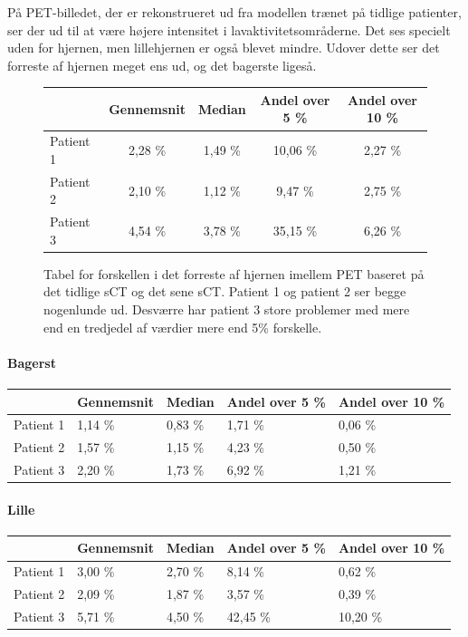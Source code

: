 På PET-billedet, der er rekonstrueret ud fra modellen trænet på tidlige
patienter, ser der ud til at være højere intensitet i
lavaktivitetsområderne. Det ses specielt uden for hjernen, men
lillehjernen er også blevet mindre. Udover dette ser det forreste af
hjernen meget ens ud, og det bagerste ligeså.

\begin{figure}
    \centering
    \begin{tabular}{| l | c | c | c | c |}
        \hline
         & Gennemsnit & Median & Andel over 5 \% & Andel over 10 \% \\ \hline
        Patient 1 & 2,28 \% & 1,49 \% & 10,06 \% & 2,27 \% \\ \hline
        Patient 2 & 2,10 \% & 1,12 \% & 9,47 \% & 2,75 \% \\ \hline
        Patient 3 & 4,54 \% & 3,78 \% & 35,15 \% & 6,26 \% \\ \hline
    \end{tabular}
    \caption{Tabel for forskellen i det forreste af hjernen imellem PET baseret på det tidlige sCT og det sene sCT. Patient 1 og patient 2 ser begge nogenlunde ud. Desværre har patient 3 store problemer med mere end en tredjedel af værdier mere end 5\% forskelle.}
    \label{tab:over_tid_forresthjerne}
\end{figure}

\paragraph{Bagerst}

\begin{center}
    \begin{tabular}{| l | l | l | l | l |}
    \hline
     & Gennemsnit & Median & Andel over 5 \% & Andel over 10 \% \\ \hline
    Patient 1 & 1,14 \% & 0,83 \% & 1,71 \% & 0,06 \% \\ \hline
    Patient 2 & 1,57 \% & 1,15 \% & 4,23 \% & 0,50 \% \\ \hline
    Patient 3 & 2,20 \% & 1,73 \% & 6,92 \% & 1,21 \% \\ \hline
    \end{tabular}
\end{center}

\paragraph{Lille}

\begin{center}
    \begin{tabular}{| l | l | l | l | l |}
    \hline
     & Gennemsnit & Median & Andel over 5 \% & Andel over 10 \% \\ \hline
    Patient 1 & 3,00 \% & 2,70 \% & 8,14 \% & 0,62 \% \\ \hline
    Patient 2 & 2,09 \% & 1,87 \% & 3,57 \% & 0,39 \% \\ \hline
    Patient 3 & 5,71 \% & 4,50 \% & 42,45 \% & 10,20 \% \\ \hline
    \end{tabular}
\end{center}

